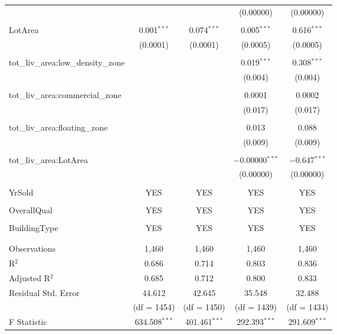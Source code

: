 \documentclass[a4paper]{article}
\begin{document}
\begin{table}[!htbp]
\begin{adjustwidth}{-0.0cm}{-0cm}
\begin{threeparttable}
\begin{tabular}{@{\extracolsep{1pt}}lcccc}
  &  &  & (0.00000) & (0.00000) \\ 
  & & & & \\ 
 LotArea & 0.001$^{***}$ & 0.074$^{***}$ & 0.005$^{***}$ & 0.616$^{***}$ \\ 
  & (0.0001) & (0.0001) & (0.0005) & (0.0005) \\ 
  & & & & \\ 
 tot\_liv\_area:low\_density\_zone &  &  & 0.019$^{***}$ & 0.308$^{***}$ \\ 
  &  &  & (0.004) & (0.004) \\ 
  & & & & \\ 
 tot\_liv\_area:commercial\_zone &  &  & 0.0001 & 0.0002 \\ 
  &  &  & (0.017) & (0.017) \\ 
  & & & & \\ 
 tot\_liv\_area:floating\_zone &  &  & 0.013 & 0.088 \\ 
  &  &  & (0.009) & (0.009) \\ 
  & & & & \\ 
 tot\_liv\_area:LotArea &  &  & $-$0.00000$^{***}$ & $-$0.647$^{***}$ \\ 
  &  &  & (0.00000) & (0.00000) \\ 
  & & & & \\ 
 YrSold & YES & YES & YES & YES \\ 
  & & & & \\ 
 OverallQual & YES & YES & YES & YES \\  
 & & & & \\ 
 BuildingType & YES & YES & YES & YES \\ 
 & & & & \\ 
\hline \\[-1.8ex] 
Observations & 1,460 & 1,460 & 1,460 & 1,460 \\ 
R$^{2}$ & 0.686 & 0.714 & 0.803 & 0.836 \\ 
Adjusted R$^{2}$ & 0.685 & 0.712 & 0.800 & 0.833 \\ 
Residual Std. Error & 44.612 & 42.645 & 35.548 & 32.488 \\ 
& (df = 1454) & (df = 1450) & (df = 1439) & (df = 1434)\\
F Statistic & 634.508$^{***}$  & 401.461$^{***}$  & 292.393$^{***}$  & 291.609$^{***}$  \\ 

\end{tabular}
\end{threeparttable}
\end{adjustwidth}
\end{table}
\end{document}
